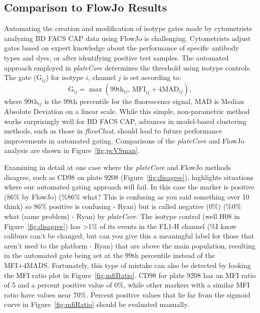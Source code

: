 \documentclass[12pt]{article}
\newcommand{\Rpackage}[1]{{\textit{#1}}}
\begin{document}
\clearpage
\subsection*{Comparison to FlowJo Results}
Automating the creation and modification of isotype gates made by cytometrists analyzing BD FACS CAP data
using FlowJo is challenging. Cytometrists adjust gates based on expert knowledge about the performance of 
specific antibody types and dyes, or after identifying positive test samples. The automated approach
employed in \Rpackage{plateCore} determines the threshold using isotype controls.  The gate (G$_{ij}$) for isotype $i$, channel $j$
is set according to:
\begin{equation}
\text{G}_{ij} = \max (\text{99th}_{ij} \text{, MFI}_{ij}+ 4 \text{MAD}_{ij}),
\label{isoGate}
\end{equation}
where 99th$_{ij}$ is the 99th percentile for the fluorescence signal,
MAD is Median Absolute Deviation %
on a linear scale. While this simple, non-parametric method works surprisingly well for BD FACS CAP,
advances in model-based clustering methods, such as those in \Rpackage{flowClust}, should lead
to future performance improvements in automated gating. Comparisons of the \Rpackage{plateCore} and FlowJo 
analysis are shown in Figure~\ref{fig:pcVSman}.

Examining in detail at one case where the \Rpackage{plateCore} and FlowJo methods disagree, such
as CD98 on plate 9208 (Figure~\ref{fig:disagree}), highlights situations where our automated gating
approach will fail. In this case the marker is positive (86\% by FlowJo) (\%86\%
what? This is confusing as you said something over 10%
think) so 86\% positive is confusing - Ryan) but is 
called negative (0\%) (\%0\% what (same problem) - Ryan)
by \Rpackage{plateCore}. The isotype control (well H08 in Figure~\ref{fig:disagree})
has >1\% of its events in the FL1-H channel (\%I know caliburs can't be changed,
but can you give this a meaningful label for those that aren't used to the
platform - Ryan) that are above the main population, resulting in the automated
gate being set at the 99th percentile instead of the MFI+4MADS. Fortunately, this type of mistake can also be detected by looking the MFI ratio plot in Figure~\ref{fig:mfiRatio}. CD98 for plate 9208 has an MFI
ratio of 5 and a percent positive value of 0\%, while other markers with a similar MFI ratio have values
near 70\%. Percent positive values that lie far from the sigmoid curve in Figure~\ref{fig:mfiRatio}
should be evaluated manually.
\end{document}
